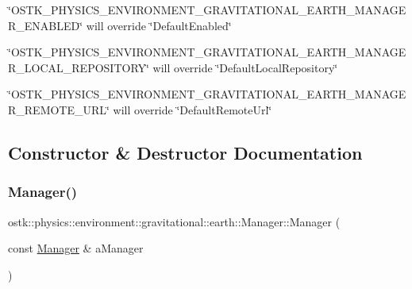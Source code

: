 \begin{DoxyItemize}
\item \char`\"{}\+O\+S\+T\+K\+\_\+\+P\+H\+Y\+S\+I\+C\+S\+\_\+\+E\+N\+V\+I\+R\+O\+N\+M\+E\+N\+T\+\_\+\+G\+R\+A\+V\+I\+T\+A\+T\+I\+O\+N\+A\+L\+\_\+\+E\+A\+R\+T\+H\+\_\+\+M\+A\+N\+A\+G\+E\+R\+\_\+\+E\+N\+A\+B\+L\+E\+D\char`\"{} will override \char`\"{}\+Default\+Enabled\char`\"{}
\item \char`\"{}\+O\+S\+T\+K\+\_\+\+P\+H\+Y\+S\+I\+C\+S\+\_\+\+E\+N\+V\+I\+R\+O\+N\+M\+E\+N\+T\+\_\+\+G\+R\+A\+V\+I\+T\+A\+T\+I\+O\+N\+A\+L\+\_\+\+E\+A\+R\+T\+H\+\_\+\+M\+A\+N\+A\+G\+E\+R\+\_\+\+L\+O\+C\+A\+L\+\_\+\+R\+E\+P\+O\+S\+I\+T\+O\+R\+Y\char`\"{} will override \char`\"{}\+Default\+Local\+Repository\char`\"{}
\item \char`\"{}\+O\+S\+T\+K\+\_\+\+P\+H\+Y\+S\+I\+C\+S\+\_\+\+E\+N\+V\+I\+R\+O\+N\+M\+E\+N\+T\+\_\+\+G\+R\+A\+V\+I\+T\+A\+T\+I\+O\+N\+A\+L\+\_\+\+E\+A\+R\+T\+H\+\_\+\+M\+A\+N\+A\+G\+E\+R\+\_\+\+R\+E\+M\+O\+T\+E\+\_\+\+U\+R\+L\char`\"{} will override \char`\"{}\+Default\+Remote\+Url\char`\"{} 
\end{DoxyItemize}

\subsection{Constructor \& Destructor Documentation}
\mbox{\label{classostk_1_1physics_1_1environment_1_1gravitational_1_1earth_1_1_manager_ac8ea6e08db0342132a14d071bd3f0107}} 
\subsubsection{\texorpdfstring{Manager()}{Manager()}}
{\footnotesize\ttfamily ostk\+::physics\+::environment\+::gravitational\+::earth\+::\+Manager\+::\+Manager (\begin{DoxyParamCaption}\item[{const \hyperlink{classostk_1_1physics_1_1environment_1_1gravitational_1_1earth_1_1_manager}{Manager} \&}]{a\+Manager }\end{DoxyParamCaption})\hspace{0.3cm}{\ttfamily [delete]}}



